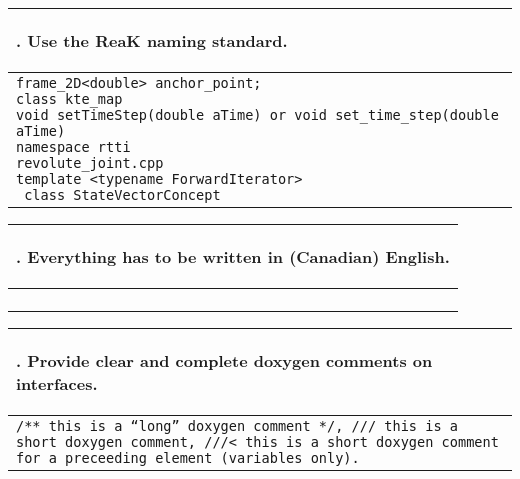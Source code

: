 \documentclass[10pt]{article}
\newcommand{\code}[1]{\color[rgb]{0.2,0.8,0.2}\texttt{#1}\color[rgb]{0,0,0} }
\newcounter {iCommandment}
\newcommand{\CorG}[5]
{
\begin{table}[H]
\begin{center}
\begin{tabular}{| p{12cm} |}
\hline
#1. #2 \\
\hline
\vspace{-0.1cm}
\parbox{12cm}{\code{#3}} \\
\vspace{-0.2cm}
#4 \\
#5 \\
\hline
\end{tabular}
\end{center}
\end{table}
}
\newcommand{\Commandment}[4]
{
\CorG{\textbf{\arabic{iCommandment}}\addtocounter{iCommandment}{1}}
{\textbf{#1}}{#2}{#3}{#4}
}
\begin{document}
\Commandment
{Use the ReaK naming standard.}
{frame\_2D<double> anchor\_point; \\ class kte\_map \\ void setTimeStep(double aTime) or void set\_time\_step(double aTime) \\ namespace rtti \\ revolute\_joint.cpp \\ template <typename ForwardIterator> \\ class StateVectorConcept}
{
Basically, lower-case underscore-separated names are the convention for just about everything in non-templated code, and 
CamelCase is the convention for template arguments and concept-check class templates. This is in harmony
with the C++ STL and Boost libraries. ReaK was developed over many years and conventions have evolved so don't be 
surprised to see some other conventions for some classes. One such example is the name for the functions, in ReaK, 
both the camelCase (with leading lower-case) and the lower-case underscore-separated names are common and accepted.
To avoid conflicts between data members and parameter values, the convention is to use a leading-lower case camelCase for 
parameter names, with the addition of an ``a'' at the front. File names also follow the underscore-separation and lower-case,
the names of the files do not have to be exactly the name of the class declared in that file, but it is preferred to do so 
if the file in question does only contain that one class. Finally, as usual, names with all upper-case letters are 
reserved for MACROs and \#defines, nothing else, and should at least be pre-pended with \code{RK\_}\ to avoid name-clashes.
}
{\ }

\Commandment
{Everything has to be written in (Canadian) English.}
{\ }
{In an international environment English is the preferred language, Canadian English (which allows for both 
the British and American spelling).}
{\ }

\Commandment
{Provide clear and complete doxygen comments on interfaces.}
{/** this is a ``long'' doxygen comment */,  /// this is a short doxygen comment, 
 ///< this is a short doxygen comment for a preceeding element (variables only).}
{The code has to be perfectly understandable for an outside developer. Practically this means full 
Doxygen documentation of the header file (with tags: ``file'', ``author'', ``date'', and possibly others 
like ``todo'' and ``test''), of the function declarations (with tags: ``param'', ``return'' and ``tparam''; and, 
if applicable: ``test'', ``pre'', ``post'', ``throw'', and ``note''; the ``brief'' tag is desired but optional), 
and class declarations (with tags: ``author'', ``tparam'', ``test'' and ``todo'', whenever applicable).}
{\ }
\end{document}
